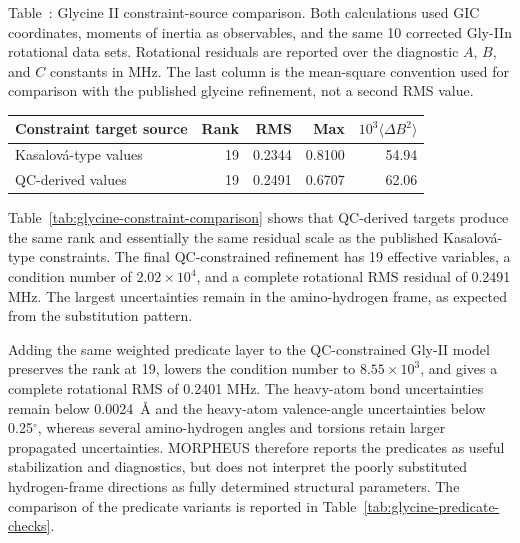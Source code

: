 \documentclass[aip,jcp,reprint,longbibliography,floatfix]{revtex4-2}
\begin{document}
\begin{center}
\label{tab:glycine-constraint-comparison}
\parbox{0.94\linewidth}{\small\raggedright Table~\thetable: Glycine II
constraint-source comparison. Both calculations used GIC coordinates, moments
of inertia as observables, and the same 10 corrected Gly-IIn rotational data
sets. Rotational residuals are reported over the diagnostic $A$, $B$, and $C$
constants in MHz. The last column is the mean-square convention used for
comparison with the published glycine refinement, not a second RMS value.\par}
\smallskip
\small
\begin{tabular}{lrrrr}
\toprule
Constraint target source & Rank & RMS & Max & $10^3\langle\Delta B^2\rangle$ \\
\midrule
Kasalov{\'a}-type values & 19 & 0.2344 & 0.8100 & 54.94 \\
QC-derived values & 19 & 0.2491 & 0.6707 & 62.06 \\
\bottomrule
\end{tabular}
\end{center}

Table~\ref{tab:glycine-constraint-comparison} shows that QC-derived targets
produce the same rank and essentially the same residual scale as the published
Kasalov{\'a}-type constraints. The final QC-constrained refinement has 19
effective variables, a condition number of $2.02\times10^4$, and a complete
rotational RMS residual of 0.2491 MHz. The largest uncertainties remain in the
amino-hydrogen frame, as expected from the substitution pattern.

Adding the same weighted predicate layer to the QC-constrained Gly-II model
preserves the rank at 19, lowers the condition number to $8.55\times10^3$, and
gives a complete rotational RMS of 0.2401 MHz. The heavy-atom bond
uncertainties remain below 0.0024~\AA{} and the heavy-atom valence-angle
uncertainties below 0.25$^\circ$, whereas several amino-hydrogen angles and
torsions retain larger propagated uncertainties. MORPHEUS therefore reports
the predicates as useful stabilization and diagnostics, but does not interpret
the poorly substituted hydrogen-frame directions as fully determined structural
parameters. The comparison of the predicate variants is reported in
Table~\ref{tab:glycine-predicate-checks}.
\end{document}
